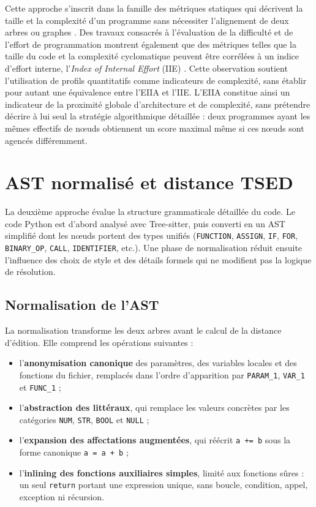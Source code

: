 {Cette approche s'inscrit dans la famille des métriques statiques qui
décrivent la taille et la complexité d'un programme sans nécessiter
l'alignement de deux arbres ou graphes \cite{messer_2024}. Des travaux
consacrés à l'évaluation de la difficulté et de l'effort de programmation
montrent également que des métriques telles que la taille du code et la
complexité cyclomatique peuvent être corrélées à un indice d'effort interne,
l'\emph{Index of Internal Effort} (IIE) \cite{de_oliveira_assessing_2024}.
Cette observation soutient l'utilisation de profils quantitatifs comme
indicateurs de complexité, sans établir pour autant une équivalence entre
l'EIIA et l'IIE. L'EIIA constitue ainsi un indicateur de la proximité globale
d'architecture et de complexité, sans prétendre décrire à lui seul la
stratégie algorithmique détaillée : deux programmes ayant les mêmes effectifs
de nœuds obtiennent un score maximal même si ces nœuds sont agencés
différemment.

\section{AST normalisé et distance TSED}

La deuxième approche évalue la structure grammaticale détaillée du code. Le
code Python est d'abord analysé avec Tree-sitter, puis converti en un AST
simplifié dont les nœuds portent des types unifiés (\texttt{FUNCTION},
\texttt{ASSIGN}, \texttt{IF}, \texttt{FOR}, \texttt{BINARY\_OP},
\texttt{CALL}, \texttt{IDENTIFIER}, etc.). Une phase de normalisation réduit
ensuite l'influence des choix de style et des détails formels qui ne
modifient pas la logique de résolution.

\subsection{Normalisation de l'AST}

La normalisation transforme les deux arbres avant le calcul de la distance
d'édition. Elle comprend les opérations suivantes :

\begin{itemize}
    \item l'\textbf{anonymisation canonique} des paramètres, des variables
    locales et des fonctions du fichier, remplacés dans l'ordre d'apparition
    par \texttt{PARAM\_1}, \texttt{VAR\_1} et \texttt{FUNC\_1} ;
    \item l'\textbf{abstraction des littéraux}, qui remplace les valeurs
    concrètes par les catégories \texttt{NUM}, \texttt{STR}, \texttt{BOOL}
    et \texttt{NULL} ;
    \item l'\textbf{expansion des affectations augmentées}, qui réécrit
    \texttt{a += b} sous la forme canonique \texttt{a = a + b} ;
    \item l'\textbf{inlining des fonctions auxiliaires simples}, limité aux
    fonctions sûres : un seul \texttt{return} portant une expression unique,
    sans boucle, condition, appel, exception ni récursion.
\end{itemize}

}
